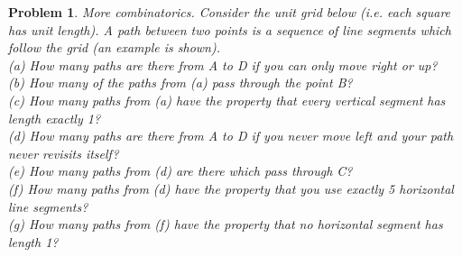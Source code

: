 \documentclass{article}
\newtheorem{problem}{Problem}
\theoremstyle{definition}
\begin{document}
\begin{problem}
More combinatorics. Consider the unit grid below (i.e. each square has unit length). A
path between two points is a sequence of line segments which follow the grid (an example is
shown).\\

(a) How many paths are there from A to D if you can only move right or up?\\

(b) How many of the paths from (a) pass through the point B?\\

(c) How many paths from (a) have the property that every vertical segment has length
exactly 1?\\

(d) How many paths are there from A to D if you never move left and your path never
revisits itself?\\

(e) How many paths from (d) are there which pass through C?\\

(f) How many paths from (d) have the property that you use exactly 5 horizontal line
segments?\\

(g) How many paths from (f) have the property that no horizontal segment has length 1?\\\\


\end{problem}
\end{document}
